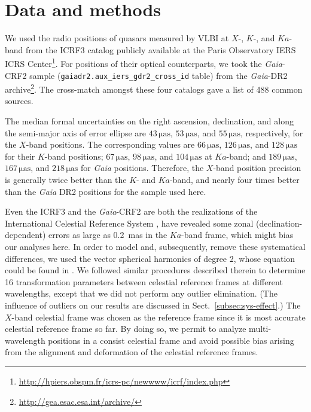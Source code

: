 \documentclass{aa-note}   %
\begin{document}
\section{Data and methods}    \label{sec:obs}

We used the radio positions of quasars measured by VLBI at $X$-, $K$-, and $Ka$-band from the ICRF3 catalog publicly available at the Paris Observatory IERS ICRS Center\footnote{\url{http://hpiers.obspm.fr/icrs-pc/newwww/icrf/index.php}}.
For positions of their optical counterparts, we took the \textit{Gaia}-CRF2 sample (\texttt{gaiadr2.aux\_iers\_gdr2\_cross\_id} table) from the \textit{Gaia}-DR2 archive\footnote{\url{http://gea.esac.esa.int/archive/}}.
The cross-match amongst these four catalogs gave a list of 488 common sources.

The median formal uncertainties on the right ascension, declination, and along the semi-major axis of error ellipse are $\mathrm{43\,\mu as}$, $\mathrm{53\,\mu as}$, and $\mathrm{55\,\mu as}$, respectively, for the $X$-band positions.
The corresponding values are $\mathrm{66\,\mu as}$, $\mathrm{126\,\mu as}$, and $\mathrm{128\,\mu as}$ for their $K$-band positions; 
$\mathrm{67\,\mu as}$, $\mathrm{98\,\mu as}$, and $\mathrm{104\,\mu as}$ at $Ka$-band; 
and $\mathrm{189\,\mu as}$, $\mathrm{167\,\mu as}$, and $\mathrm{218\,\mu as}$ for \textit{Gaia} positions. 
Therefore, the $X$-band position precision is generally twice better than the $K$- and $Ka$-band, and nearly four times better than the \textit{Gaia} DR2 positions for the sample used here.

Even the ICRF3 and the \textit{Gaia}-CRF2 are both the realizations of the International Celestial Reference System \citep[ICRS;][]{1995A&A...303..604A,1998A&A...331L..33F}, \citet{2020A&A...634A..28L} have revealed some zonal (declination-dependent) errors as large as 0.2~mas in the $Ka$-band frame, which might bias our analyses here.
In order to model and, subsequently, remove these systematical differences, 
we used the vector spherical harmonics \citep[VSH;][]{2012A&A...547A..59M} of degree 2, whose equation could be found in \citet[][their Eq.~(1)]{2020A&A...634A..28L}.
We followed similar procedures described therein to determine 16 transformation parameters between celestial reference frames at different wavelengths, except that we did not perform any outlier elimination.
(The influence of outliers on our results are discussed in Sect.~\ref{subsec:sys-effect}.)
The $X$-band celestial frame was chosen as the reference frame since it is most accurate celestial reference frame so far.
By doing so, we permit to analyze multi-wavelength positions in a consist celestial frame and avoid possible bias arising from the alignment and deformation of the celestial reference frames.
\end{document}
